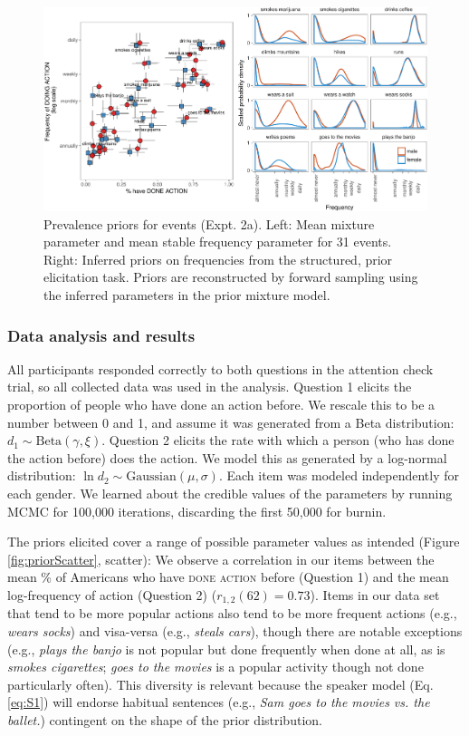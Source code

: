 \documentclass[english,floatsintext,man]{apa6}
\theoremstyle{definition}
\theoremstyle{definition}
\theoremstyle{definition}
\theoremstyle{remark}
\begin{document}
\begin{figure}[htbp]
\centering
\includegraphics{figs/habituals-prior-figure-1.pdf}
\caption{\label{fig:habituals-prior-figure}Prevalence priors for events
(Expt. 2a). Left: Mean mixture parameter and mean stable frequency
parameter for 31 events. Right: Inferred priors on frequencies from the
structured, prior elicitation task. Priors are reconstructed by forward
sampling using the inferred parameters in the prior mixture model.}
\end{figure}

\subsubsection{Data analysis and
results}\label{data-analysis-and-results}

All participants responded correctly to both questions in the attention
check trial, so all collected data was used in the analysis. Question 1
elicits the proportion of people who have done an action before. We
rescale this to be a number between 0 and 1, and assume it was generated
from a Beta distribution: \(d_{1} \sim \text{Beta}(\gamma, \xi)\).
Question 2 elicits the rate with which a person (who has done the action
before) does the action. We model this as generated by a log-normal
distribution: \(\ln d_{2} \sim \text{Gaussian}(\mu, \sigma)\). Each item
was modeled independently for each gender. We learned about the credible
values of the parameters by running MCMC for 100,000 iterations,
discarding the first 50,000 for burnin.

The priors elicited cover a range of possible parameter values as
intended (Figure \ref{fig:priorScatter}, scatter): We observe a
correlation in our items between the mean \% of Americans who have
\textsc{done action} before (Question 1) and the mean log-frequency of
action (Question 2) (\(r_{1,2}(62) = 0.73\)). Items in our data set that
tend to be more popular actions also tend to be more frequent actions
(e.g., \emph{wears socks}) and visa-versa (e.g., \emph{steals cars}),
though there are notable exceptions (e.g., \emph{plays the banjo} is not
popular but done frequently when done at all, as is
\emph{smokes cigarettes}; \emph{goes to the movies} is a popular
activity though not done particularly often). This diversity is relevant
because the speaker model (Eq. \ref{eq:S1}) will endorse habitual
sentences (e.g., \emph{Sam goes to the movies vs. the ballet.})
contingent on the shape of the prior distribution.
\end{document}
